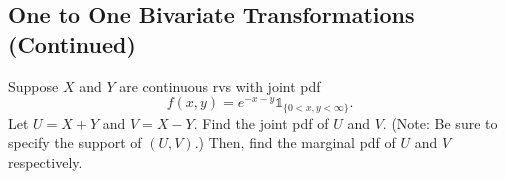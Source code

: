 \documentclass[notoc,notitlepage]{tufte-book}
\begin{document}
\subsection{One to One Bivariate Transformations (Continued)}%
\label{sub:one_to_one_bivariate_transformations_continued}

\begin{eg}
  Suppose $X$ and $Y$ are continuous rvs with joint pdf
  \begin{equation*}
    f(x, y) = e^{-x - y} \mathbb{1}_{\{0 < x, y < \infty\}}.
  \end{equation*}
  Let $U = X + Y$ and $V = X - Y$. Find the joint pdf of $U$ and $V$. (Note: Be sure to specify the support of $(U, V)$.) Then, find the marginal pdf of $U$ and $V$ respectively.
\end{eg}
\end{document}
